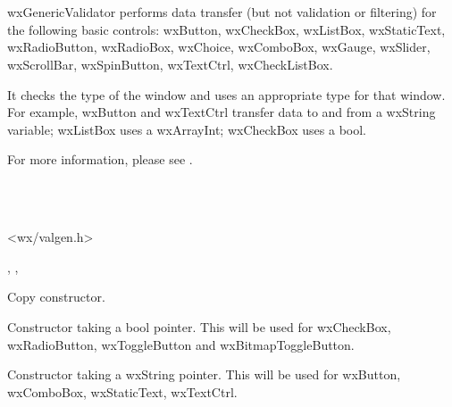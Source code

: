 \section{}\label{wxgenericvalidator}

wxGenericValidator performs data transfer (but not validation or filtering) for the following
basic controls: wxButton, wxCheckBox, wxListBox, wxStaticText, wxRadioButton, wxRadioBox,
wxChoice, wxComboBox, wxGauge, wxSlider, wxScrollBar, wxSpinButton, wxTextCtrl, wxCheckListBox.

It checks the type of the window and uses an appropriate type for that window. For example,
wxButton and wxTextCtrl transfer data to and from a wxString variable; wxListBox uses a
wxArrayInt; wxCheckBox uses a bool.

For more information, please see .


\\
\\


<wx/valgen.h>




, ,


\label{wxgenericvalidatorctor}


Copy constructor.


Constructor taking a bool pointer. This will be used for wxCheckBox,
wxRadioButton, wxToggleButton and wxBitmapToggleButton.


Constructor taking a wxString pointer. This will be used for wxButton,
wxComboBox, wxStaticText, wxTextCtrl.

